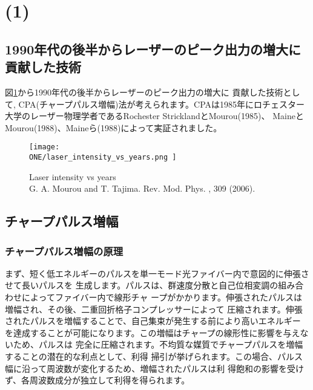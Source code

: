 
\section{(1)}
  \subsection{1990年代の後半からレーザーのピーク出力の増大に貢献した技術}
    図\ref{Laser_intensity_vs_years}から1990年代の後半からレーザーのピーク出力の増大に
    貢献した技術として, CPA(チャープパルス増幅)法が考えられます。CPAは1985年にロチェスター
    大学のレーザー物理学者であるRochester StricklandとMourou(1985)、
    MaineとMourou(1988)、Maineら(1988)によって実証されました。\cite{ref. 01}
    \begin{figure}[H]
      \centering
      \texttt{[image: 
        \\ONE/laser\_intensity\_vs\_years.png
      ]}
      \caption{Laser intensity vs years \\ G. A. Mourou and T. Tajima. Rev. Mod. Phys. , 309 (2006).}
      \label{Laser_intensity_vs_years}
    \end{figure}

  \subsection{チャープパルス増幅}
    \subsubsection{チャープパルス増幅の原理}
      まず、短く低エネルギーのパルスを単一モード光ファイバー内で意図的に伸張させて長いパルスを
      生成します。パルスは、群速度分散と自己位相変調の組み合わせによってファイバー内で線形チャ
      ープがかかります。伸張されたパルスは増幅され、その後、二重回折格子コンプレッサーによって
      圧縮されます。伸張されたパルスを増幅することで、自己集束が発生する前により高いエネルギー
      を達成することが可能になります。この増幅はチャープの線形性に影響を与えないため、パルスは
      完全に圧縮されます。不均質な媒質でチャープパルスを増幅することの潜在的な利点として、利得
      掃引が挙げられます。この場合、パルス幅に沿って周波数が変化するため、増幅されたパルスは利
      得飽和の影響を受けず、各周波数成分が独立して利得を得られます。\cite{ref. 02}

